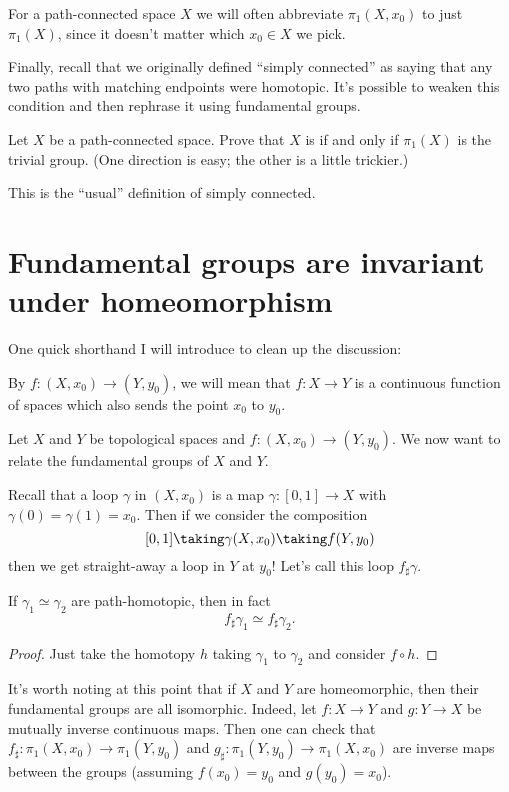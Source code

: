 \begin{abuse}
	For a path-connected space $X$ we will often abbreviate $\pi_1(X, x_0)$
	to just $\pi_1(X)$, since it doesn't matter which $x_0 \in X$
	we pick.
\end{abuse}

Finally, recall that we originally defined ``simply connected'' as saying
that any two paths with matching endpoints were homotopic.
It's possible to weaken this condition and then rephrase it using
fundamental groups.
\begin{exercise}
	Let $X$ be a path-connected space.
	Prove that $X$ is  if and only if
	$\pi_1(X)$ is the trivial group.
	(One direction is easy; the other is a little trickier.)
\end{exercise}
This is the ``usual'' definition of simply connected.


\section{Fundamental groups are invariant under homeomorphism}
One quick shorthand I will introduce to clean up the discussion:
\begin{definition}
	By $f \colon (X, x_0) \to (Y, y_0)$, we will mean that
	$f \colon X \to Y$ is a continuous function of spaces
	which also sends the point $x_0$ to $y_0$.
\end{definition}

Let $X$ and $Y$ be topological spaces and $f \colon (X, x_0) \to (Y, y_0)$.
We now want to relate the fundamental groups of $X$ and $Y$.

Recall that a loop $\gamma$ in $(X, x_0)$ is a map $\gamma \colon [0,1] \to X$
with $\gamma(0) = \gamma(1) = x_0$.
Then if we consider the composition
\[ [0,1] \taking\gamma (X, x_0) \taking f (Y, y_0) \]
then we get straight-away a loop in $Y$ at $y_0$!
Let's call this loop $f_\sharp \gamma$.
\begin{lemma}
	\label{lem:fsharp_homotopy_invariant}
	If $\gamma_1 \simeq \gamma_2$ are path-homotopic,
	then in fact
	\[ f_\sharp \gamma_1 \simeq f_\sharp \gamma_2. \]
\end{lemma}
\begin{proof}
	Just take the homotopy $h$ taking $\gamma_1$ to $\gamma_2$
	and consider $f \circ h$.
\end{proof}

It's worth noting at this point that if $X$ and $Y$ are homeomorphic,
then their fundamental groups are all isomorphic.
Indeed, let $f \colon X \to Y$ and $g \colon Y \to X$ be mutually inverse continuous maps.
Then one can check that $f_\sharp \colon \pi_1(X, x_0) \to \pi_1(Y, y_0)$
and $g_\sharp \colon \pi_1(Y, y_0) \to \pi_1(X, x_0)$ are inverse maps
between the groups (assuming $f(x_0) = y_0$ and $g(y_0) = x_0$).

